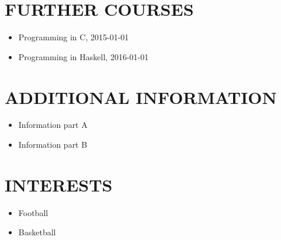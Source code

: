 \documentclass{article}
\begin{document}
\section{FURTHER COURSES}
\begin{itemize}
\item Programming in C, 2015-01-01
\item Programming in Haskell, 2016-01-01
\end{itemize}
\section{ADDITIONAL INFORMATION}
\begin{itemize}
\item Information part A
\item Information part B
\end{itemize}
\section{INTERESTS}
\begin{itemize}
\item Football
\item Basketball
\end{itemize}
\end{document}
